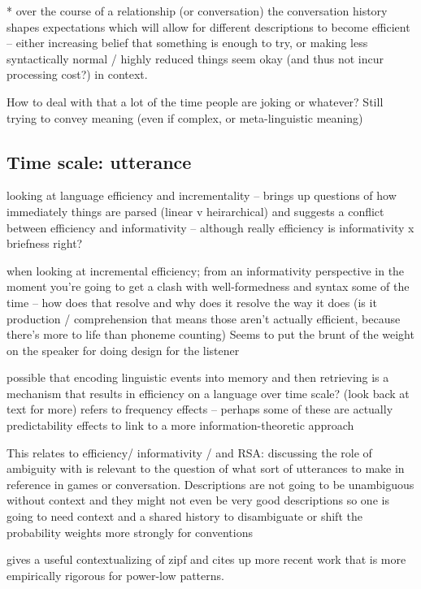 \documentclass[]{article}
\begin{document}
* over the course of a relationship (or conversation) the conversation history shapes expectations which will allow for different descriptions to become efficient -- either increasing belief that something is enough to try, or making less syntactically normal / highly reduced things seem okay (and thus not incur processing cost?) in context. 

How to deal with that a lot of the time people are joking or whatever? Still trying to convey meaning (even if complex, or meta-linguistic meaning)

\subsection{Time scale: utterance} 
\cite{rubio-fernandez2021} looking at language efficiency and incrementality -- brings up questions of how immediately things are parsed (linear v heirarchical) and suggests a conflict between efficiency and informativity -- although really efficiency is informativity x briefness right? 

\cite{rubio-fernandez2021} when looking at incremental efficiency; from an informativity perspective in the moment you're going to get a clash with well-formedness and syntax some of the time -- how does that resolve and why does it resolve the way it does (is it production / comprehension that means those aren't actually efficient, because there's more to life than phoneme counting) Seems to put the brunt of the weight on the speaker for doing design for the listener 


\cite{bybee2006} possible that encoding linguistic events into memory and then retrieving is a mechanism that results in efficiency on a language over time scale? (look back at text for more) 
refers to frequency effects -- perhaps some of these are actually predictability effects to link to a more information-theoretic approach 

This relates to efficiency/ informativity / and RSA: \cite{piantadosi2012} discussing the role of ambiguity with is relevant to the question of what sort of utterances to make in reference in games or conversation. Descriptions are not going to be unambiguous without context and they might not even be very good descriptions so one is going to need context and a shared history to disambiguate or shift the probability weights more strongly for conventions

\cite{piantadosi2012} gives a useful contextualizing of zipf and cites up more recent work that is more empirically rigorous for power-low patterns. 
\end{document}
